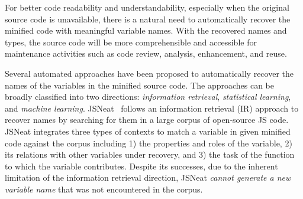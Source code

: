

%
%

For better code readability and understandability, especially when the
original source code is unavailable, there is a natural need to
automatically recover the minified code with meaningful variable
names. With the recovered names and types, the source code will be
more comprehensible and accessible for maintenance activities such
as code review, analysis, enhancement, and reuse.




Several automated approaches have been proposed to automatically
recover the names of the variables in the minified source code.  The
approaches can be broadly classified into two directions: {\em
  information retrieval}, {\em statistical learning}, and {\em machine
  learning}.  JSNeat~\cite{icse19} follows an information retrieval
(IR) approach to recover names by searching for them in a large corpus
of open-source JS code. JSNeat integrates three types of contexts to
match a variable in given minified code against the corpus including
1) the properties and roles of the variable, 2)
its relations with other variables under
recovery, and 3)
the task of the function to which the variable contributes.  Despite
its successes, due to the inherent limitation of the information
retrieval direction, JSNeat {\em cannot generate a new variable name}
that was not encountered in the corpus.

